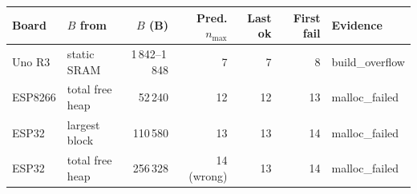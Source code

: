 \begin{tabular}{@{}llrrrrl@{}}
\toprule
Board & $B$ from & $B$ (B) & Pred. $n_{\max}$ & Last ok & First fail & Evidence \\
\midrule
Uno R3 & static SRAM & 1\,842--1\,848 & 7 & 7 & 8 & build\_overflow \\
ESP8266 & total free heap & 52\,240 & 12 & 12 & 13 & malloc\_failed \\
ESP32 & largest block & 110\,580 & 13 & 13 & 14 & malloc\_failed \\
ESP32 & total free heap & 256\,328 & 14 (wrong) & 13 & 14 & malloc\_failed \\
\bottomrule
\end{tabular}
